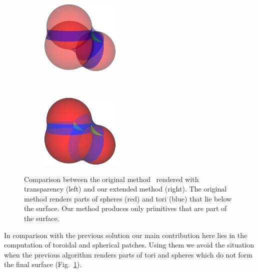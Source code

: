 \begin{figure}[htp]
  \centering
  \begin{subfigure}[t]{0.48\columnwidth}
    \centering
    \includegraphics[width=1.5in]{image/cb-krone.png}
  \end{subfigure}%
  ~
  \begin{subfigure}[t]{0.48\columnwidth}
    \centering
    \includegraphics[width=1.5in]{image/cb-oit.png}
  \end{subfigure}
	
\caption{Comparison between the original method~\cite{krone2011parallel} rendered with transparency (left) and our extended method (right).
The original method renders parts of spheres (red) and tori (blue) that lie below the surface.
Our method produces only primitives that are part of the surface.
}
\label{fig:cb-oit}
\end{figure}

In comparison with the previous solution our main contribution here lies in the computation of toroidal and spherical patches.
Using them we avoid the situation when the previous algorithm renders parts of tori and spheres which do not form the final surface (Fig.~\ref{fig:cb-oit}).



